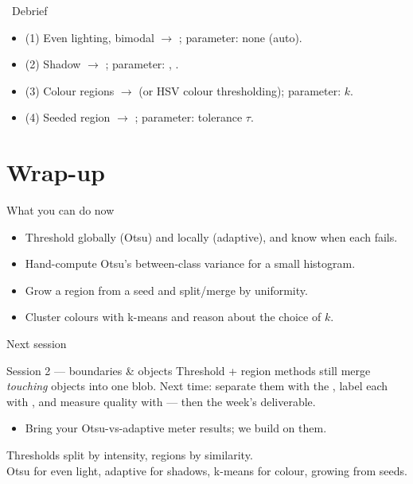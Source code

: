 \documentclass[10pt,aspectratio=169]{beamer}
\begin{document}
\begin{frame}{\faPen~Debrief}
  \begin{itemize}
    \item (1) Even lighting, bimodal $\rightarrow$ ; parameter: none (auto).
    \item (2) Shadow $\rightarrow$ ; parameter: , .
    \item (3) Colour regions $\rightarrow$  (or HSV colour thresholding); parameter: $k$.
    \item (4) Seeded region $\rightarrow$ ; parameter: tolerance $\tau$.
  \end{itemize}
\end{frame}

\section{Wrap-up}

\begin{frame}{What you can do now}
  \begin{itemize}
    \item Threshold globally (Otsu) and locally (adaptive), and know when each fails.
    \item Hand-compute Otsu's between-class variance for a small histogram.
    \item Grow a region from a seed and split/merge by uniformity.
    \item Cluster colours with k-means and reason about the choice of $k$.
  \end{itemize}
\end{frame}

\begin{frame}{Next session}
  \begin{alertblock}{Session 2 --- boundaries \& objects}
    Threshold + region methods still merge \emph{touching} objects into one blob.
    Next time: separate them with the , label each with , and measure quality with  --- then the week's deliverable.
  \end{alertblock}
  \begin{itemize}
    \item Bring your Otsu-vs-adaptive meter results; we build on them.
  \end{itemize}
\end{frame}

\begin{frame}[standout]
  Thresholds split by intensity, regions by similarity.\\[4pt]
  \normalsize Otsu for even light, adaptive for shadows, k-means for colour, growing from seeds.
\end{frame}
\end{document}

